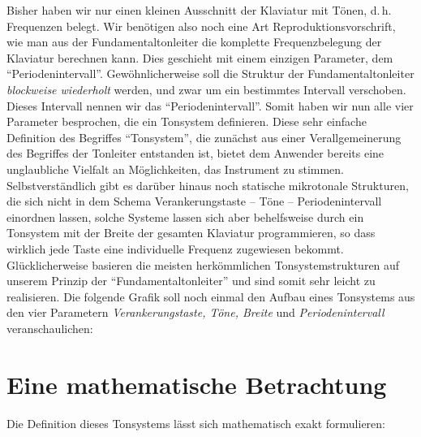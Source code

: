Bisher haben wir nur einen kleinen Ausschnitt der Klaviatur mit Tönen,
d.\,h. Frequenzen belegt. Wir benötigen also noch eine Art
Reproduktionsvorschrift, wie man aus der Fundamentaltonleiter die komplette
Frequenzbelegung der Klaviatur
berechnen kann. Dies geschieht mit einem einzigen Parameter, dem
"`Periodenintervall"'. Gewöhnlicherweise soll die Struktur der
Fundamentaltonleiter \emph{blockweise wiederholt} werden, und zwar um
ein bestimmtes Intervall verschoben. Dieses Intervall nennen wir das
"`Periodenintervall"'.  Somit haben wir nun
alle vier Parameter besprochen, die ein Tonsystem definieren. Diese
sehr einfache Definition des Begriffes "`Tonsystem"', die zunächst aus
einer Verallgemeinerung des Begriffes der Tonleiter entstanden ist,
bietet dem Anwender bereits eine unglaubliche Vielfalt an
Möglichkeiten, das Instrument zu stimmen. Selbstverständlich gibt es
darüber hinaus noch statische mikrotonale Strukturen, die sich nicht in
dem Schema Verankerungstaste -- Töne -- Periodenintervall einordnen
lassen, solche Systeme lassen sich aber behelfsweise durch ein
Tonsystem mit der Breite der gesamten Klaviatur programmieren, so dass
wirklich jede Taste eine individuelle Frequenz zugewiesen bekommt.
Glücklicherweise basieren die meisten herkömmlichen
Tonsystemstrukturen auf unserem Prinzip der "`Fundamentaltonleiter"'
und sind somit sehr leicht zu realisieren. Die folgende Grafik soll
noch einmal den Aufbau eines Tonsystems aus den vier Parametern {\itshape
  Verankerungstaste, Töne, Breite \/} und \emph{Periodenintervall}
veranschaulichen:

\begin{center}

\end{center}

\section{Eine mathematische Betrachtung}\label{sec:eine-math-betr}
Die Definition dieses Tonsystems lässt sich mathematisch exakt
formulieren:
\label{MATHE}

